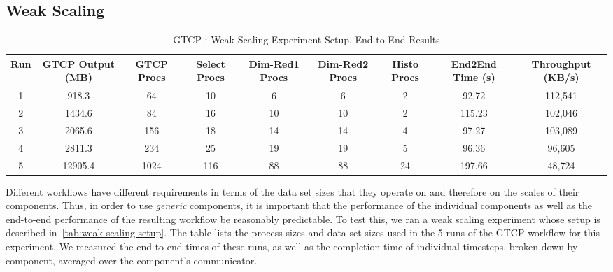 \subsection{Weak Scaling}
\begin{table}[tbp]
  \centering
  \caption{GTCP-\sys: Weak Scaling Experiment Setup, End-to-End Results}
  \label{tab:weak-scaling-setup}
  \vspace{-0.07in}
  \begin{tabular}{|c|c|c|c|c|c|c|c|c|}
    \hline
    Run & GTCP Output (MB) & GTCP Procs & Select Procs & Dim-Red1 Procs & Dim-Red2 Procs & Histo Procs & End2End Time (s) & Throughput (KB/s)\\
    \hline
    1 & 918.3 & 64 & 10 & 6 & 6 & 2 & 92.72 & 112,541\\
    \hline
    2 & 1434.6 & 84 & 16 & 10 & 10 & 2 & 115.23 & 102,046\\
    \hline
    3 & 2065.6 & 156 & 18 & 14 & 14 & 4 & 97.27 & 103,089\\
    \hline
    4 & 2811.3 & 234 & 25 & 19 & 19 & 5 & 96.36 & 96,605\\
    \hline
    5 & 12905.4 & 1024 & 116 & 88 & 88 & 24 & 197.66 & 48,724\\
    \hline
  \end{tabular}
  \vspace{-0.15in}
\end{table}
Different workflows have different requirements in terms
of the data set sizes that they operate on and therefore
on the scales of their components.
Thus, in order to use \textit{generic} components, it is important
that the performance of the individual components
as well as the end-to-end performance of the resulting
workflow be reasonably predictable.
To test this, we ran a weak scaling experiment
whose setup is described in~\autoref{tab:weak-scaling-setup}.
The table lists the process sizes and data set sizes used in the 5
runs of the GTCP workflow for this experiment.
We measured the end-to-end times of these runs,
as well as the completion time of individual
timesteps, broken down by component, averaged
over the component's communicator.

